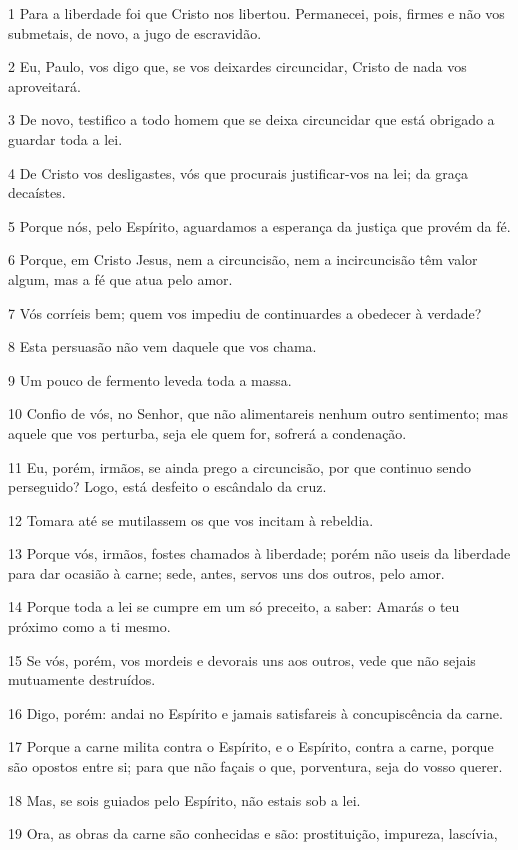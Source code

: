 \par 1 Para a liberdade foi que Cristo nos libertou. Permanecei, pois, firmes e não vos submetais, de novo, a jugo de escravidão.
\par 2 Eu, Paulo, vos digo que, se vos deixardes circuncidar, Cristo de nada vos aproveitará.
\par 3 De novo, testifico a todo homem que se deixa circuncidar que está obrigado a guardar toda a lei.
\par 4 De Cristo vos desligastes, vós que procurais justificar-vos na lei; da graça decaístes.
\par 5 Porque nós, pelo Espírito, aguardamos a esperança da justiça que provém da fé.
\par 6 Porque, em Cristo Jesus, nem a circuncisão, nem a incircuncisão têm valor algum, mas a fé que atua pelo amor.
\par 7 Vós corríeis bem; quem vos impediu de continuardes a obedecer à verdade?
\par 8 Esta persuasão não vem daquele que vos chama.
\par 9 Um pouco de fermento leveda toda a massa.
\par 10 Confio de vós, no Senhor, que não alimentareis nenhum outro sentimento; mas aquele que vos perturba, seja ele quem for, sofrerá a condenação.
\par 11 Eu, porém, irmãos, se ainda prego a circuncisão, por que continuo sendo perseguido? Logo, está desfeito o escândalo da cruz.
\par 12 Tomara até se mutilassem os que vos incitam à rebeldia.
\par 13 Porque vós, irmãos, fostes chamados à liberdade; porém não useis da liberdade para dar ocasião à carne; sede, antes, servos uns dos outros, pelo amor.
\par 14 Porque toda a lei se cumpre em um só preceito, a saber: Amarás o teu próximo como a ti mesmo.
\par 15 Se vós, porém, vos mordeis e devorais uns aos outros, vede que não sejais mutuamente destruídos.
\par 16 Digo, porém: andai no Espírito e jamais satisfareis à concupiscência da carne.
\par 17 Porque a carne milita contra o Espírito, e o Espírito, contra a carne, porque são opostos entre si; para que não façais o que, porventura, seja do vosso querer.
\par 18 Mas, se sois guiados pelo Espírito, não estais sob a lei.
\par 19 Ora, as obras da carne são conhecidas e são: prostituição, impureza, lascívia,
